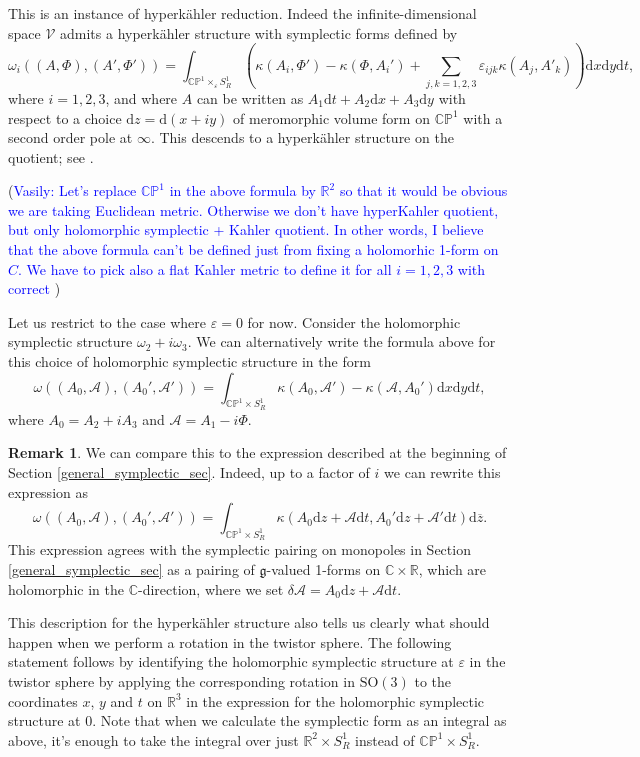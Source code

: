 \documentclass[11pt, oneside, reqno]{amsart}
\theoremstyle{definition} \newtheorem{definition}{Definition}[section]
\theoremstyle{definition} \newtheorem{remark}[definition]{Remark}
\theoremstyle{definition} \newtheorem{remarks}[definition]{Remarks}
\theoremstyle{definition} \newtheorem{question}[definition]{Question}
\theoremstyle{definition} \newtheorem*{note}{Note}
\theoremstyle{definition} \newtheorem{example}[definition]{Example}
\theoremstyle{definition} \newtheorem{examples}[definition]{Examples}
\renewcommand{\gg}{\mathfrak{g}}
\newcommand{\bb}[1]{\mathbb{#1}}
\newcommand{\mc}[1]{\mathcal{#1}}
\newcommand{\ol}[1]{\overline{#1}}
\newcommand{\CC}{\mathbb{C}}
\newcommand{\RR}{\mathbb{R}}
\newcommand{\eps}{\varepsilon}
\newcommand{\SO}{\mathrm{SO}}
\renewcommand{\d}{\mathrm{d}}
\newcommand{\vasily}[1]{(\textcolor{blue}{Vasily: #1})}
\begin{document}
This is an instance of hyperk\"ahler reduction.  Indeed the infinite-dimensional space $\mc V$ admits a hyperk\"ahler structure with symplectic forms defined by
\[\omega_i((A,\Phi),(A',\Phi')) = \int_{\bb{CP}^1 \times_\eps S^1_R} \left(\kappa(A_i,\Phi') - \kappa(\Phi, A_i') + \sum_{j,k=1,2,3} \eps_{ijk} \kappa(A_j,A'_k)\right) \d x \d y \d t, \]
where $i=1,2,3$, and where $A$ can be written as $A_1 \d t + A_2 \d x + A_3 \d y$ with respect to a choice $\d z = \d (x + iy)$ of meromorphic volume form on $\bb{CP}^1$ with a second order pole at $\infty$.  This descends to a hyperk\"ahler structure on the quotient; see \cite[Section 1.4.2]{FoscoloThesis}.

\vasily{Let's replace $\mathbb{CP}^1$ in the above formula by $\mathbb{R}^2$
  so that it would be obvious we are taking Euclidean metric. Otherwise
  we don't have hyperKahler quotient, but only holomorphic symplectic + Kahler
  quotient. In other words, I believe that the above formula
  can't be defined just from fixing a holomorhic 1-form on $C$. We have to
  pick also a flat Kahler metric to define it for all $i=1,2,3$
with correct }

Let us restrict to the case where $\eps=0$ for now.  Consider the holomorphic symplectic structure $\omega_2 + i \omega_3$.  We can alternatively write the formula above for this choice of holomorphic symplectic structure in the form
\[\omega((A_0, \mc A), (A_0', \mc A')) = \int_{\bb{CP}^1 \times S^1_R} \kappa(A_0, \mc A') - \kappa(\mc A, A_0') \d x \d y \d t,\]
where $A_0 = A_2 + i A_3$ and $\mc A = A_1 - i \Phi$.  

\begin{remark}
We can compare this to the expression described at the beginning of Section \ref{general_symplectic_sec}. Indeed, up to a factor of $i$ we can rewrite this expression as
\[\omega((A_0, \mc A), (A_0', \mc A')) = \int_{\bb{CP}^1 \times S^1_R} \kappa(A_0\d z + \mc A \d t, A_0' \d z + \mc A' \d t) \d \ol{z}.\]
This expression agrees with the symplectic pairing on monopoles in Section \ref{general_symplectic_sec} as a pairing of $\gg$-valued 1-forms on $\CC \times \RR$, which are holomorphic in the $\CC$-direction, where we set $\delta \mc A = A_0\d z + \mc A \d t$.
\end{remark}

This description for the hyperk\"ahler structure also tells us clearly what should happen when we perform a rotation in the twistor sphere.  The following statement follows by identifying the holomorphic symplectic structure at $\eps$ in the twistor sphere by applying the corresponding rotation in $\SO(3)$ to the coordinates $x$, $y$ and $t$ on $\RR^3$ in the expression for the holomorphic symplectic structure at $0$.  Note that when we calculate the symplectic form as an integral as above, it's enough to take the integral over just $\RR^2 \times S^1_R$ instead of $\bb{CP}^1 \times S^1_R$.
\end{document}
